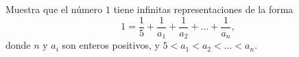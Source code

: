 Muestra que el número $1$ tiene infinitas representaciones de la forma
\[ 1 =\frac{1}{5}+\frac{1}{a_1}+\frac{1}{a_2}+ ...+\frac{1}{a_n}, \]
donde $n$ y $a_i$ son enteros positivos, y $5\lt a_1\lt a_2\lt\dots\lt a_n$.